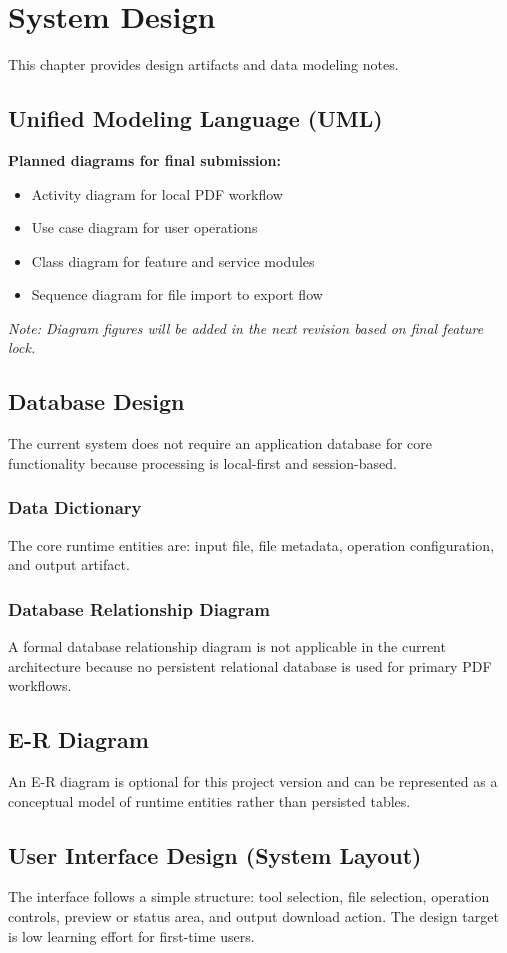 \section{System Design}
This chapter provides design artifacts and data modeling notes.

\subsection{Unified Modeling Language (UML)}
\textbf{Planned diagrams for final submission:}
\begin{itemize}
  \item Activity diagram for local PDF workflow
  \item Use case diagram for user operations
  \item Class diagram for feature and service modules
  \item Sequence diagram for file import to export flow
\end{itemize}

\textit{Note: Diagram figures will be added in the next revision based on final feature lock.}

\subsection{Database Design}
The current system does not require an application database for core functionality because processing is local-first and session-based.

\subsubsection{Data Dictionary}
The core runtime entities are: input file, file metadata, operation configuration, and output artifact.

\subsubsection{Database Relationship Diagram}
A formal database relationship diagram is not applicable in the current architecture because no persistent relational database is used for primary PDF workflows.

\subsection{E-R Diagram}
An E-R diagram is optional for this project version and can be represented as a conceptual model of runtime entities rather than persisted tables.

\subsection{User Interface Design (System Layout)}
The interface follows a simple structure: tool selection, file selection, operation controls, preview or status area, and output download action. The design target is low learning effort for first-time users.
